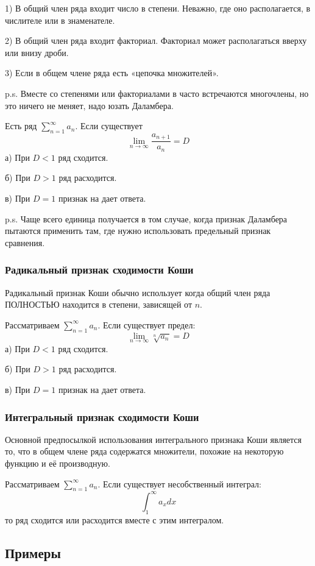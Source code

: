 \documentclass[12pt,a4paper]{article}
\begin{document}
1) В общий член ряда входит число в степени. Неважно, где оно располагается, в числителе или в знаменателе.

2) В общий член ряда входит факториал. Факториал может располагаться вверху или внизу дроби.

3) Если в общем члене ряда есть «цепочка множителей».

p.s. Вместе со степенями или факториалами в часто встречаются многочлены, но это ничего не меняет, надо юзать Даламбера.

Есть ряд $ \sum_{n=1}^{\infty} a_n $. Если существует
\[ \lim_{n \to \infty} \frac{a_{n+1}}{a_n}=D \]
а) При $ D<1 $ ряд сходится.

б) При $ D>1 $ ряд расходится.

в) При $ D=1 $ признак на дает ответа.

p.s. Чаще всего единица получается в том случае, когда признак Даламбера пытаются применить там, где нужно использовать предельный признак сравнения.
\subsubsection{Радикальный признак сходимости Коши}
Радикальный признак Коши обычно использует когда общий член ряда ПОЛНОСТЬЮ находится в степени, зависящей от $ n $.

Рассматриваем $ \sum_{n=1}^{\infty} a_n $. Если существует предел:
\[ \lim_{n \to \infty} \sqrt[n]{a_n}=D \]
а) При $ D<1 $ ряд сходится.

б) При $ D>1 $ ряд расходится.

в) При $ D=1 $ признак на дает ответа.

\subsubsection{Интегральный признак сходимости Коши}
Основной предпосылкой использования интегрального признака Коши является то, что в общем члене ряда содержатся множители, похожие на некоторую функцию и её производную.

Рассматриваем $ \sum_{n=1}^{\infty} a_n $. Если существует несобственный интеграл:
\[ \int_{1}^{\infty}a_xdx \]
то ряд сходится или расходится вместе с этим интегралом.
\subsection{Примеры}
\end{document}
